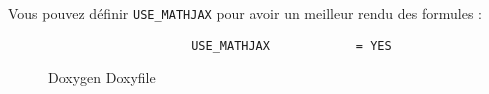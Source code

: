			Vous pouvez définir  \verb+USE_MATHJAX+ pour avoir un meilleur rendu des formules :

			\begin{figure}[H]
				\begin{changemargin}{-2.5cm}{-2.5cm}
				\begin{tcolorbox}
				\begin{verbatim}
					USE_MATHJAX            = YES
				\end{verbatim}
				\end{tcolorbox}
				\end{changemargin}
				\caption{Doxygen Doxyfile}
			\end{figure}
